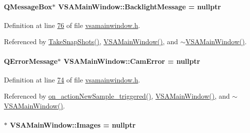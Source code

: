 \paragraph[{Backlight\+Message}]{\setlength{\rightskip}{0pt plus 5cm}Q\+Message\+Box$\ast$ V\+S\+A\+Main\+Window\+::\+Backlight\+Message = nullptr\hspace{0.3cm}{\ttfamily [private]}}\label{class_v_s_a_main_window_a2202203116e6126f9361de629986b7b4}


Definition at line \hyperlink{vsamainwindow_8h_source_l00076}{76} of file \hyperlink{vsamainwindow_8h_source}{vsamainwindow.\+h}.



Referenced by \hyperlink{vsamainwindow_8cpp_source_l00391}{Take\+Snap\+Shots()}, \hyperlink{vsamainwindow_8cpp_source_l00004}{V\+S\+A\+Main\+Window()}, and \hyperlink{vsamainwindow_8cpp_source_l00254}{$\sim$\+V\+S\+A\+Main\+Window()}.

\hypertarget{class_v_s_a_main_window_ae59279edd83472b7096db4b119ceb45b}{}
\paragraph[{Cam\+Error}]{\setlength{\rightskip}{0pt plus 5cm}Q\+Error\+Message$\ast$ V\+S\+A\+Main\+Window\+::\+Cam\+Error = nullptr\hspace{0.3cm}{\ttfamily [private]}}\label{class_v_s_a_main_window_ae59279edd83472b7096db4b119ceb45b}


Definition at line \hyperlink{vsamainwindow_8h_source_l00074}{74} of file \hyperlink{vsamainwindow_8h_source}{vsamainwindow.\+h}.



Referenced by \hyperlink{vsamainwindow_8cpp_source_l00361}{on\+\_\+action\+New\+Sample\+\_\+triggered()}, \hyperlink{vsamainwindow_8cpp_source_l00004}{V\+S\+A\+Main\+Window()}, and \hyperlink{vsamainwindow_8cpp_source_l00254}{$\sim$\+V\+S\+A\+Main\+Window()}.

\hypertarget{class_v_s_a_main_window_a5976cf149c1aff5011c75d058f7f1c8a}{}
\paragraph[{Images}]{$\ast$ V\+S\+A\+Main\+Window\+::\+Images = nullptr\hspace{0.3cm}{\ttfamily [private]}}\label{class_v_s_a_main_window_a5976cf149c1aff5011c75d058f7f1c8a}


